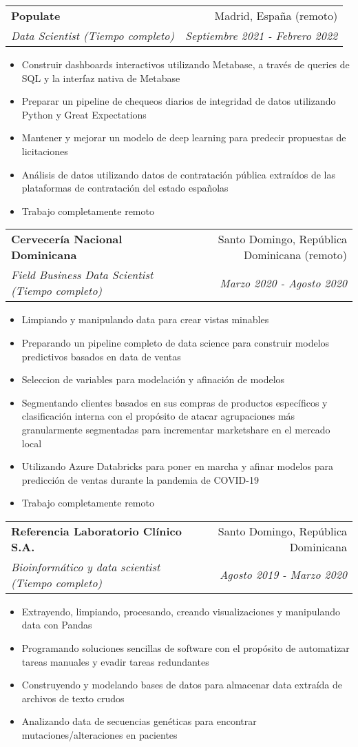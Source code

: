 \documentclass[a4paper,20pt]{article}
\makeatletter
\newcommand{\resumeSubheading}[4]{
  \vspace{-1pt}\item
    \begin{tabular*}{0.97\textwidth}{l@{\extracolsep{\fill}}r}
      \textbf{#1} & #2 \\
      \textit{#3} & \textit{#4} \\
    \end{tabular*}\vspace{-5pt}
}
\makeatother
\begin{document}
  \resumeSubheading{Populate}{Madrid, España (remoto)}
    {Data Scientist (Tiempo completo)}{Septiembre 2021 - Febrero 2022}
\begin{itemize} \itemsep-0.24em
  \item Construir dashboards interactivos utilizando Metabase, a través de queries de SQL y la interfaz nativa de Metabase
  \item Preparar un pipeline de chequeos diarios de integridad de datos utilizando Python y Great Expectations
  \item Mantener y mejorar un modelo de deep learning para predecir propuestas de licitaciones
  \item Análisis de datos utilizando datos de contratación pública extraídos de las plataformas de contratación del estado españolas
  \item Trabajo completamente remoto
\end{itemize}
\vspace{-4.2pt}
  \resumeSubheading{Cervecería Nacional Dominicana}{Santo Domingo, República Dominicana (remoto)}
    {Field Business Data Scientist (Tiempo completo)}{Marzo 2020 - Agosto 2020}
\begin{itemize} \itemsep-0.24em
  \item Limpiando y manipulando data para crear vistas minables
  \item Preparando un pipeline completo de data science para construir modelos predictivos basados en data de ventas
  \item Seleccion de variables para modelación y afinación de modelos
  \item Segmentando clientes basados en sus compras de productos específicos y clasificación interna con el propósito de atacar agrupaciones más granularmente segmentadas para incrementar marketshare en el mercado local
  \item Utilizando Azure Databricks para poner en marcha y afinar modelos para predicción de ventas durante la pandemia de COVID-19
  \item Trabajo completamente remoto
\end{itemize}
\vspace{-4.2pt}
  \resumeSubheading{Referencia Laboratorio Clínico S.A.}{Santo Domingo, República Dominicana}
    {Bioinformático y data scientist (Tiempo completo)}{Agosto 2019 - Marzo 2020}
\begin{itemize} \itemsep-0.24em
  \item Extrayendo, limpiando, procesando, creando visualizaciones y manipulando data con Pandas
  \item Programando soluciones sencillas de software con el propósito de automatizar tareas manuales y evadir tareas redundantes
  \item Construyendo y modelando bases de datos para almacenar data extraída de archivos de texto crudos
  \item Analizando data de secuencias genéticas para encontrar mutaciones/alteraciones en pacientes
\end{itemize}
\end{document}
